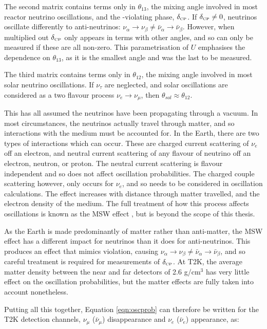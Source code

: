 The second matrix contains terms only in $\theta_{13}$, the mixing angle involved in most reactor neutrino oscillations, and the \CP-violating phase, $\delta_{\scriptscriptstyle\mathrm{CP}}$. If $\delta_{\scriptscriptstyle\mathrm{CP}} \neq 0$, neutrinos oscillate differently to anti-neutrinos: $\nu_{\alpha} \rightarrow \nu_{\beta} \neq \bar{\nu}_{\alpha} \rightarrow \bar{\nu}_{\beta}$. However, when multiplied out $\delta_{\scriptscriptstyle\mathrm{CP}}$ only appears in terms with other angles, and so can only be measured if these are all non-zero. This parametrisation of $U$ emphasises the dependence on $\theta_{13}$, as it is the smallest angle and was the last to be measured.

The third matrix contains terms only in $\theta_{12}$, the mixing angle involved in most solar neutrino oscillations. If $\nu_\tau$ are neglected, and solar oscillations are considered as a two flavour process $\nu_{e} \rightarrow \nu_{\mu}$, then $\theta_{sol} \approx \theta_{12}$.

This has all assumed the neutrinos have been propagating through a vacuum. In most circumstances, the neutrinos actually travel through matter, and so interactions with the medium must be accounted for. In the Earth, there are two types of interactions which can occur. These are charged current scattering of $\nu_{e}$ off an electron, and neutral current scattering of any flavour of neutrino off an electron, neutron, or proton. The neutral current scattering is flavour independent and so does not affect oscillation probabilities. The charged couple scattering however, only occurs for $\nu_{e}$, and so needs to be considered in oscillation calculations. The effect increases with distance through matter travelled, and the electron density of the medium. The full treatment of how this process affects oscillations is known as the MSW effect \cite{msw}, but is beyond the scope of this thesis.

As the Earth is made predominantly of matter rather than anti-matter, the MSW effect has a different impact for neutrinos than it does for anti-neutrinos. This produces an effect that mimics \CP violation, causing $\nu_{\alpha} \rightarrow \nu_{\beta} \neq \bar{\nu}_{\alpha} \rightarrow \bar{\nu}_{\beta}$, and so careful treatment is required for measurements of $\delta_{\scriptscriptstyle\mathrm{CP}}$. At T2K, the average matter density between the near and far detectors of 2.6 g/cm$^3$ \cite{massdensity} has very little effect on the oscillation probabilities, but the matter effects are fully taken into account nonetheless.

Putting all this together, Equation \eqref{eqn:oscprob} can therefore be written for the T2K detection channels, $\nu_\mu$ ($\bar{\nu}_{\mu}$) disappearance and $\nu_e$ ($\bar{\nu}_e$) appearance, as:

